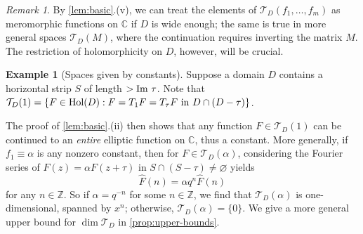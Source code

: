 \documentclass[reqno,11pt]{amsart}
\theoremstyle{definition}
\newtheorem{example}[theorem]{Example}
\theoremstyle{remark}
\newtheorem*{remark}{Remark}
\numberwithin{equation}{section}
\newcommand{\Z}{\mathbb{Z}}
\newcommand{\C}{\mathbb{C}}
\newcommand{\mT}{\mathcal{T}}
\renewcommand{\Im}{\textnormal{Im}\ }
\newcommand{\Hol}{\textnormal{Hol}}
\renewcommand{\hat}{\widehat}
\renewcommand{\emptyset}{\varnothing}
\begin{document}
\begin{remark} 
By \cref{lem:basic}.(v), we can treat the elements of $\mT_D(f_1, \ldots, f_m)$ as meromorphic functions on $\C$ if $D$ is wide enough; the same is true in more general spaces $\mT_D(M)$, where the continuation requires inverting the matrix $M$. The restriction of holomorphicity on $D$, however, will be crucial.
\end{remark}


\begin{example}[Spaces given by constants] \label{ex:constants}
Suppose a domain $D$ contains a horizontal strip $S$ of length $> \Im \tau$. Note that $\mT_D(1) = \left\{ F \in \Hol(D) : F = T_1 F = T_\tau F \text{ in } D \cap (D - \tau)\right\}$.

The proof of \cref{lem:basic}.(ii) then shows that any function $F \in \mT_D(1)$ can be continued to an \emph{entire} elliptic function on $\C$, thus a constant. More generally, if $f_1 \equiv \alpha$ is any nonzero constant, then for $F \in \mT_D(\alpha)$, considering the Fourier series of $F(z) = \alpha F(z+\tau)$ in $S \cap (S - \tau) \neq \emptyset$ yields 
\[
    \hat{F}(n) = \alpha q^n \hat{F}(n)
\] 
for any $n \in \Z$. So if $\alpha = q^{-n}$ for some $n \in \Z$, we find that $\mT_D(\alpha)$ is one-dimensional, spanned by $x^n$; otherwise, $\mT_D(\alpha) = \{0\}$. We give a more general upper bound for $\dim \mT_D$ in \cref{prop:upper-bounds}.
\end{example}

\end{document}
